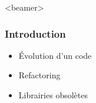 \begin{frame}<beamer>
\frametitle{Introduction}
\begin{itemize}
	\item Évolution d'un code
	\item Refactoring
	\item Librairies obsolètes
\end{itemize}
\end{frame}



